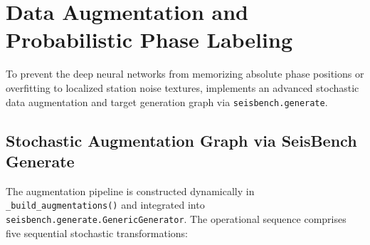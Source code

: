 \section{Data Augmentation and Probabilistic Phase Labeling}
\label{sec:data_augmentation}

To prevent the deep neural networks from memorizing absolute phase positions or
overfitting to localized station noise textures, 
implements an advanced stochastic data augmentation and target generation graph
via \texttt{seisbench.generate}.

\subsection{Stochastic Augmentation Graph via SeisBench Generate}
\label{subsec:augmentation_graph}

The augmentation pipeline is constructed dynamically in
\texttt{\_build\_augmentations()}
and integrated into \texttt{seisbench.generate.GenericGenerator}.
The operational
sequence comprises five sequential stochastic transformations:

